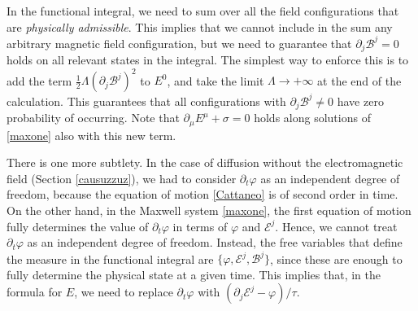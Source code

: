 \documentclass[a4paper, amsfonts, amssymb, amsmath, reprint, showkeys, nofootinbib, twoside,notitlepage,onecolumn,preprintnumbers]{revtex4-2}
\theoremstyle{definition}
\theoremstyle{theorem}
\theoremstyle{corollary}
\begin{document}
In the functional integral, we need to sum over all the field configurations that are \textit{physically admissible}. This implies that we cannot include in the sum any arbitrary magnetic field configuration, but we need to guarantee that $\partial_j \mathcal{B}^j=0$ holds on all relevant states in the integral. The simplest way to enforce this is to add the term $\frac{1}{2}\Lambda (\partial_j \mathcal{B}^j)^2$ to $E^0$, and take the limit $\Lambda \rightarrow +\infty$ at the end of the calculation. This guarantees that all configurations with $\partial_j \mathcal{B}^j \neq 0$ have zero probability of occurring. Note that $\partial_\mu E^\mu +\sigma=0$ holds along solutions of \eqref{maxone} also with this new term. 

There is one more subtlety. In the case of diffusion without the electromagnetic field (Section \ref{causuzzuz}), we had to consider $\partial_t \varphi$ as an independent degree of freedom, because the equation of motion  \eqref{Cattaneo} is of second order in time. On the other hand, in the Maxwell system \eqref{maxone}, the first equation of motion fully determines the value of $\partial_t \varphi$ in terms of $\varphi$ and $\mathcal{E}^j$. Hence, we cannot treat $\partial_t \varphi$ as an independent degree of freedom. Instead, the free variables that define the measure in the functional integral are $\{\varphi,\mathcal{E}^j,\mathcal{B}^j\}$, since these are enough to fully determine the physical state at a given time. This implies that, in the formula for $E$, we need to replace $\partial_t \varphi$ with $(\partial_j \mathcal{E}^j-\varphi)/\tau$.
\end{document}
